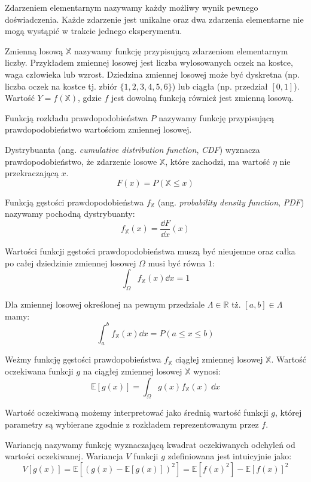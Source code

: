 \documentclass[../main.tex]{subfiles}
\begin{document}
Zdarzeniem elementarnym nazywamy każdy możliwy wynik pewnego doświadczenia. Każde zdarzenie jest unikalne oraz dwa zdarzenia elementarne nie mogą wystąpić w trakcie jednego eksperymentu.

Zmienną losową $\mathbb{X}$ nazywamy funkcję przypisującą zdarzeniom elementarnym liczby. Przykładem zmiennej losowej jest liczba wylosowanych oczek na kostce, waga człowieka lub wzrost. Dziedzina zmiennej losowej może być dyskretna (np. liczba oczek na kostce tj. zbiór $\{1,2,3,4,5,6\}$) lub ciągła (np. przedział $[0,1]$). Wartość $Y = f(\mathbb{X})$, gdzie $f$ jest dowolną funkcją również jest zmienną losową. 

Funkcją rozkładu prawdopodobieństwa $P$ nazywamy funkcję przypisującą prawdopodobieństwo wartościom zmiennej losowej. 

Dystrybuanta (ang. \textit{cumulative distribution function}, \textit{CDF})
wyznacza prawdopodobieństwo, że zdarzenie losowe $\mathbb{X}$, które zachodzi,
ma wartość $\eta$ nie przekraczającą $x$.
\[
    F(x) = P(\mathbb{X} \leq x)
\]

Funkcją gęstości prawdopodobieństwa $f_{\mathbb{X}}$ (ang. \textit{probability density
function}, \textit{PDF}) nazywamy pochodną dystrybuanty:
\[
    f_{\mathbb{X}}(x) = \frac{\dd F}{\dd x}(x)
\]

Wartości funkcji gęstości prawdopodobieństwa muszą być nieujemne oraz całka po całej dziedzinie zmiennej losowej $\Omega$ musi być równa $1$:
\[
    \int_{\Omega} f_{\mathbb{X}}(x) \dd x = 1
\]

Dla zmiennej losowej określonej na pewnym przedziale $\Lambda \in \mathbb{R}$ tż. $[a,b] \in \Lambda$ mamy:
\[
    \int_{a}^{b} f_{\mathbb{X}}(x) \dd x = P(a \leq x \leq b)
\]

Weżmy funkcję gęstości prawdopobieństwa $f_{\mathbb{X}}$ ciągłej zmiennej
losowej $\mathbb{X}$. Wartość oczekiwana funkcji $g$ na ciągłej zmiennej
losowej $\mathbb{X}$ wynosi:
\[
\mathbb{E}\left[ g(x) \right] =
\int_{\Omega}{
	g(x) f_{\mathbb{X}}(x)
	\: \dd x
}
\]

Wartość oczekiwaną możemy interpretować jako średnią wartość funkcji $g$, której parametry są wybierane zgodnie z rozkładem reprezentowanym przez $f$.

Wariancją nazywamy funkcję wyznaczającą kwadrat oczekiwanych odchyleń od wartości oczekiwanej. Wariancja $V$ funkcji $g$ zdefiniowana jest intuicyjnie jako:
\[
V\left[ g(x) \right] 
	=
	\mathbb{E}\left[ 
		\left( 
			g(x) - \mathbb{E}\left[ g(x) \right] 
		\right)^2 
	\right]
	=
	\mathbb{E}\left[
		f(x)^2
	\right] - \mathbb{E}\left[
		f(x)
	\right]^2
\]
\end{document}
